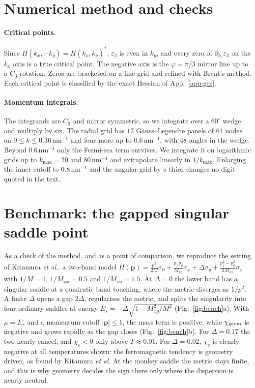 \documentclass[aps,prb,twocolumn,superscriptaddress,floatfix,nofootinbib]{revtex4-2}
\newcommand{\chie}{\chi_{e}}
\newcommand{\chig}{\chi_{\rm geom}}
\newcommand{\nm}{\,\mathrm{nm}}
\begin{document}
\section{Numerical method and checks}\label{app:numerics}

\paragraph{Critical points.} Since $H(k_x,-k_y)=H(k_x,k_y)^*$, $\varepsilon_3$ is even in $k_y$, and every zero of $\partial_{k_x}\varepsilon_3$ on the $k_x$ axis is a true critical point. The negative axis is the $\varphi=\pi/3$ mirror line up to a $C_3$ rotation. Zeros are bracketed on a fine grid and refined with Brent's method. Each critical point is classified by the exact Hessian of App.~\ref{app:ges}.

\paragraph{Momentum integrals.} The integrands are $C_3$ and mirror symmetric, so we integrate over a $60^\circ$ wedge and multiply by six. The radial grid has $12$ Gauss--Legendre panels of $64$ nodes on $0\le k\le0.36\nm^{-1}$ and four more up to $0.6\nm^{-1}$, with $48$ angles in the wedge. Beyond $0.6\nm^{-1}$ only the Fermi-sea term survives. We integrate it on logarithmic grids up to $k_{\max}=20$ and $80\nm^{-1}$ and extrapolate linearly in $1/k_{\max}$. Enlarging the inner cutoff to $0.8\nm^{-1}$ and the angular grid by a third changes no digit quoted in the text.

\section{Benchmark: the gapped singular saddle point}\label{app:benchmark}

As a check of the method, and as a point of comparison, we reproduce the setting of Kitamura \emph{et al.}: a two-band model $H(\mathbf p)=\frac{p^2}{2M}\sigma_0+\frac{p_xp_y}{M_{xy}}\sigma_x+\Delta\sigma_y+\frac{p_x^2-p_y^2}{2M_{xx}}\sigma_z$ with $1/M=1$, $1/M_{xx}=0.5$ and $1/M_{xy}=1.5$. At $\Delta=0$ the lower band has a singular saddle at a quadratic band touching, where the metric diverges as $1/p^2$. A finite $\Delta$ opens a gap $2\Delta$, regularises the metric, and splits the singularity into four ordinary saddles at energy $E_s=-\Delta\sqrt{1-M_{xy}^2/M^2}$ (Fig.~\ref{fig:bench}a). With $\mu=E_s$ and a momentum cutoff $|\mathbf p|\le1$, the mass term is positive, while $\chig$ is negative and grows rapidly as the gap closes (Fig.~\ref{fig:bench}b). For $\Delta=0.17$ the two nearly cancel, and $\chie<0$ only above $T\approx0.01$. For $\Delta=0.02$, $\chie$ is clearly negative at all temperatures shown: the ferromagnetic tendency is geometry driven, as found by Kitamura \emph{et al.} At the monkey saddle the metric stays finite, and this is why geometry decides the sign there only where the dispersion is nearly neutral.
\end{document}
